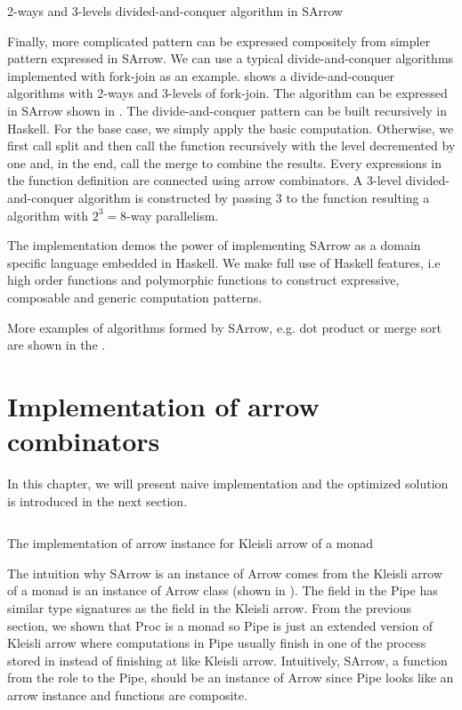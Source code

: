 \begin{listing}[ht]
    \inputminted{Haskell}{arrow/dq.hs}
    \caption{2-ways and 3-levels divided-and-conquer algorithm in SArrow}
    \label{SArrow:dq}
\end{listing}
Finally, more complicated pattern can be expressed compositely from simpler pattern expressed in SArrow. We can use a typical divide-and-conquer algorithms implemented with fork-join as an example.  shows a divide-and-conquer algorithms with 2-ways and 3-levels of fork-join. The algorithm can be expressed in SArrow shown in . The divide-and-conquer pattern can be built recursively in Haskell. For the base case, we simply apply the basic computation. Otherwise, we first call split and then call the function recursively with the level decremented by one and, in the end, call the merge to combine the results. Every expressions in the function definition are connected using arrow combinators. A 3-level divided-and-conquer algorithm is constructed by passing 3 to the function resulting a algorithm with $2^3 = 8$-way parallelism.

The implementation demos the power of implementing SArrow as a domain specific language embedded in Haskell. We make full use of Haskell features, i.e high order functions and polymorphic functions to construct expressive, composable and generic computation patterns.

More examples of algorithms formed by SArrow, e.g. dot product or merge sort are shown in the .
\section{Implementation of arrow combinators} \label{SArrow:impl}
In this chapter, we will present naive implementation and the optimized solution is introduced in the next section.

\begin{listing}[ht]
    \inputminted{Haskell}{arrow/kleisli.hs} 
    \caption{The implementation of arrow instance for Kleisli arrow of a monad}
    \label{arrow:code:kleisli}
\end{listing}
The intuition why SArrow is an instance of Arrow comes from the Kleisli arrow of a monad is an instance of Arrow class (shown in ). The  field in the Pipe has similar type signatures as the  field in the Kleisli arrow. From the previous section, we shown that Proc is a monad so Pipe is just an extended version of Kleisli arrow where computations in Pipe usually finish in one of the process stored in  instead of finishing at  like Kleisli arrow. Intuitively, SArrow, a function from the role to the Pipe, should be an instance of Arrow since Pipe looks like an arrow instance and functions are composite.

